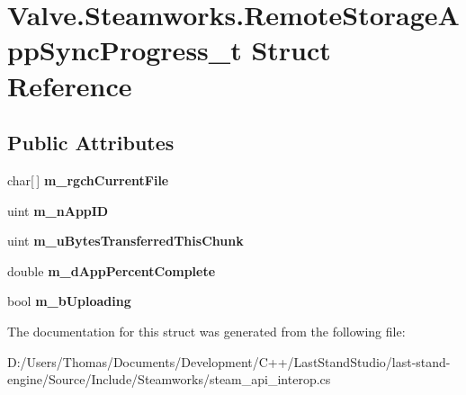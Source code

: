 \hypertarget{structValve_1_1Steamworks_1_1RemoteStorageAppSyncProgress__t}{}\section{Valve.\+Steamworks.\+Remote\+Storage\+App\+Sync\+Progress\+\_\+t Struct Reference}
\label{structValve_1_1Steamworks_1_1RemoteStorageAppSyncProgress__t}
\subsection*{Public Attributes}
\begin{DoxyCompactItemize}
\item 
\hypertarget{structValve_1_1Steamworks_1_1RemoteStorageAppSyncProgress__t_a35f087dd8b9209bfca6a9f4601719257}{}char\mbox{[}$\,$\mbox{]} {\bfseries m\+\_\+rgch\+Current\+File}\label{structValve_1_1Steamworks_1_1RemoteStorageAppSyncProgress__t_a35f087dd8b9209bfca6a9f4601719257}

\item 
\hypertarget{structValve_1_1Steamworks_1_1RemoteStorageAppSyncProgress__t_a34cca55a60b566b8a0fc6a47cf06caf5}{}uint {\bfseries m\+\_\+n\+App\+I\+D}\label{structValve_1_1Steamworks_1_1RemoteStorageAppSyncProgress__t_a34cca55a60b566b8a0fc6a47cf06caf5}

\item 
\hypertarget{structValve_1_1Steamworks_1_1RemoteStorageAppSyncProgress__t_abdf4bff436e7a400b95abadfa5916a98}{}uint {\bfseries m\+\_\+u\+Bytes\+Transferred\+This\+Chunk}\label{structValve_1_1Steamworks_1_1RemoteStorageAppSyncProgress__t_abdf4bff436e7a400b95abadfa5916a98}

\item 
\hypertarget{structValve_1_1Steamworks_1_1RemoteStorageAppSyncProgress__t_a896e63b2489f22998863f087a1fc1a42}{}double {\bfseries m\+\_\+d\+App\+Percent\+Complete}\label{structValve_1_1Steamworks_1_1RemoteStorageAppSyncProgress__t_a896e63b2489f22998863f087a1fc1a42}

\item 
\hypertarget{structValve_1_1Steamworks_1_1RemoteStorageAppSyncProgress__t_a720022c818c5eea535b2a770a362176a}{}bool {\bfseries m\+\_\+b\+Uploading}\label{structValve_1_1Steamworks_1_1RemoteStorageAppSyncProgress__t_a720022c818c5eea535b2a770a362176a}

\end{DoxyCompactItemize}


The documentation for this struct was generated from the following file\+:\begin{DoxyCompactItemize}
\item 
D\+:/\+Users/\+Thomas/\+Documents/\+Development/\+C++/\+Last\+Stand\+Studio/last-\/stand-\/engine/\+Source/\+Include/\+Steamworks/steam\+\_\+api\+\_\+interop.\+cs\end{DoxyCompactItemize}
